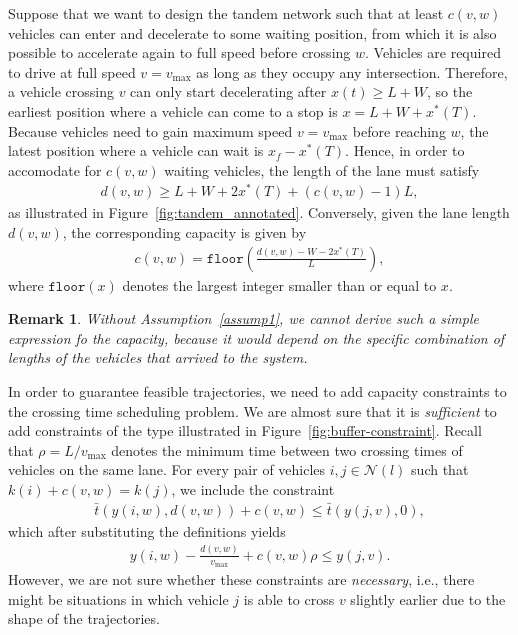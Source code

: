 \documentclass[a4paper]{article}
\theoremstyle{definition}
\theoremstyle{plain}
\newtheorem{remark}{Remark}
\begin{document}
Suppose that we want to design the tandem network such that at least $c(v,w)$
vehicles can enter and decelerate to some waiting position, from which it is
also possible to accelerate again to full speed before crossing $w$.
%
Vehicles are required to drive at full speed $v=v_{\max}$ as long as they occupy
any intersection. Therefore, a vehicle crossing $v$ can only start decelerating
after $x(t) \geq L + W$, so the earliest position where a vehicle can come to a
stop is $x = L + W + x^{*}(T)$.
%
Because vehicles need to gain maximum speed $v=v_{\max}$ before reaching $w$,
the latest position where a vehicle can wait is $x_{f} - x^{*}(T)$.
%
Hence, in order to accomodate for $c(v,w)$ waiting vehicles, the length of the
lane must satisfy
\begin{align}
  d(v, w) \geq L + W + 2x^{*}(T) + (c(v,w) - 1) L ,
\end{align}
as illustrated in Figure~\ref{fig:tandem_annotated}.
%
Conversely, given the lane length $d(v,w)$, the corresponding capacity is given
by
\begin{align}
  c(v, w) = \texttt{floor}\left( \frac{d(v,w) - W - 2 x^{*}(T)}{L} \right) ,
\end{align}
where $\texttt{floor}(x)$ denotes the largest integer smaller than or equal to $x$.

\begin{remark}
  Without Assumption~\ref{assump1}, we cannot derive such a simple expression fo
  the capacity, because it would depend on the specific combination of lengths
  of the vehicles that arrived to the system.
\end{remark}

In order to guarantee feasible trajectories, we need to add capacity constraints
to the crossing time scheduling problem. We are almost sure that it is
\textit{sufficient} to add constraints of the type illustrated in
Figure~\ref{fig:buffer-constraint}. Recall that $\rho = L / v_{\max}$ denotes
the minimum time between two crossing times of vehicles on the same lane. For
every pair of vehicles $i,j \in \mathcal{N}(l)$ such that
$k(i) + c(v,w) = k(j)$, we include the constraint
\begin{align*}
  \bar{t}(y(i, w), d(v, w)) + c(v,w) \leq \bar{t}(y(j, v), 0) ,
\end{align*}
which after substituting the definitions yields
\begin{align*}
  y(i,w) - \frac{d(v,w)}{v_{\max}} + c(v,w) \rho \leq y(j, v) .
\end{align*}
However, we are not sure whether these constraints are \textit{necessary}, i.e.,
there might be situations in which vehicle $j$ is able to cross $v$ slightly
earlier due to the shape of the trajectories.
\end{document}

